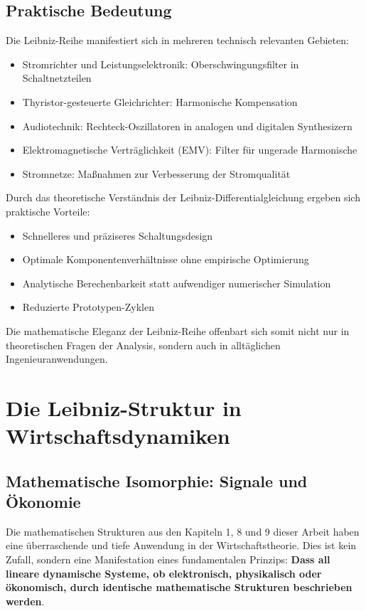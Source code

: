 \documentclass[a4paper, 12pt, twoside, openright]{report}
\theoremstyle{definition}
\theoremstyle{definition}
\begin{document}
\subsection{Praktische Bedeutung}

Die Leibniz-Reihe manifestiert sich in mehreren technisch relevanten Gebieten:

\begin{itemize}
	\item Stromrichter und Leistungselektronik: Oberschwingungsfilter in Schaltnetzteilen
	\item Thyristor-gesteuerte Gleichrichter: Harmonische Kompensation
	\item Audiotechnik: Rechteck-Oszillatoren in analogen und digitalen Synthesizern
	\item Elektromagnetische Verträglichkeit (EMV): Filter für ungerade Harmonische
	\item Stromnetze: Maßnahmen zur Verbesserung der Stromqualität
\end{itemize}

Durch das theoretische Verständnis der Leibniz-Differentialgleichung ergeben sich praktische Vorteile:

\begin{itemize}
	\item Schnelleres und präziseres Schaltungsdesign
	\item Optimale Komponentenverhältnisse ohne empirische Optimierung
	\item Analytische Berechenbarkeit statt aufwendiger numerischer Simulation
	\item Reduzierte Prototypen-Zyklen
\end{itemize}

Die mathematische Eleganz der Leibniz-Reihe offenbart sich somit nicht nur in theoretischen Fragen der Analysis, sondern auch in alltäglichen Ingenieuranwendungen.

\section{Die Leibniz-Struktur in Wirtschaftsdynamiken}

\subsection{Mathematische Isomorphie: Signale und Ökonomie}

Die mathematischen Strukturen aus den Kapiteln 1, 8 und 9 dieser Arbeit haben eine überraschende und tiefe Anwendung in der Wirtschaftstheorie. Dies ist kein Zufall, sondern eine Manifestation eines fundamentalen Prinzips: \textbf{Dass all lineare dynamische Systeme, ob elektronisch, physikalisch oder ökonomisch, durch identische mathematische Strukturen beschrieben werden}.
\end{document}
